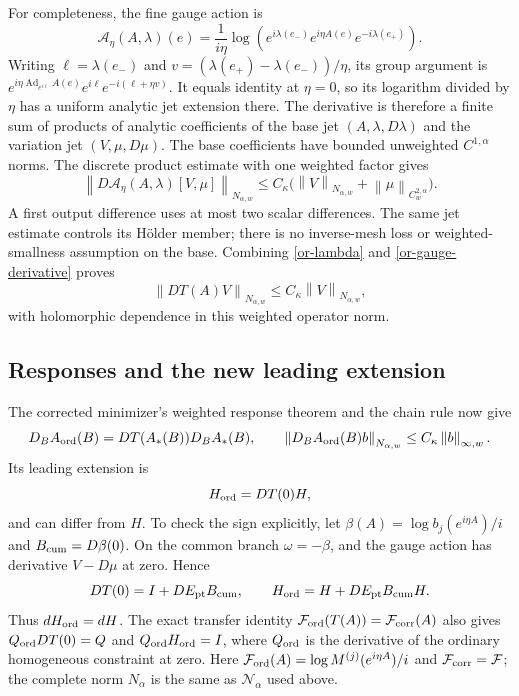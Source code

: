 \documentclass[11pt]{article}
\theoremstyle{remark}
\newcommand{\norm}[1]{\left\|#1\right\|}
\begin{document}
For completeness, the fine gauge action is
\[
 \mathscr A_\eta(A,\lambda)(e)=\frac1{i\eta}\log
 (e^{i\lambda(e_-)}e^{i\eta A(e)}e^{-i\lambda(e_+)}).
\]
Writing $\ell=\lambda(e_-)$ and
$v=(\lambda(e_+)-\lambda(e_-))/\eta$, its group argument is
$e^{i\eta\operatorname{Ad}_{e^{i\ell}}A(e)}
e^{i\ell}e^{-i(\ell+\eta v)}$.
It equals identity at $\eta=0$, so its logarithm divided by
$\eta$ has a uniform analytic jet extension there.
The derivative is therefore a finite sum of products of analytic
coefficients of the base jet $(A,\lambda,D\lambda)$ and the
variation jet $(V,\mu,D\mu)$. The base coefficients have bounded
unweighted $C^{1,\alpha}$ norms. The discrete product estimate
with one weighted factor gives
\begin{equation}\label{or-gauge-derivative}
 \norm{D\mathscr A_\eta(A,\lambda)[V,\mu]}_{N_{\alpha,w}}
 \le C_\kappa\bigl(\norm{V}_{N_{\alpha,w}}
                         +\norm{\mu}_{C^{2,\alpha}_w}\bigr).
\end{equation}
A first output difference uses at most two scalar differences.
The same jet estimate controls its H\"older member; there is no
inverse-mesh loss or weighted-smallness assumption on the base.
Combining \eqref{or-lambda} and \eqref{or-gauge-derivative} proves
\begin{equation}\label{or-DT}
 \norm{DT(A)V}_{N_{\alpha,w}}
                  \le C_\kappa\norm{V}_{N_{\alpha,w}},
\end{equation}
with holomorphic dependence in this weighted operator norm.

\subsection{Responses and the new leading extension}

The corrected minimizer's weighted response theorem and the chain
rule now give
\begin{equation}\label{or-first}
 D_BA_{\rm ord}(B)=DT(A_*(B))D_BA_*(B),\qquad
 \norm{D_BA_{\rm ord}(B)b}_{N_{\alpha,w}}
                 \le C_\kappa\norm{b}_{\infty,w}.
\end{equation}
Its leading extension is
\begin{equation}\label{or-leading}
 H_{\rm ord}=DT(0)H,
\end{equation}
and can differ from $H$. To check the sign explicitly, let
$\beta(A)=\log b_j(e^{i\eta A})/i$ and
$B_{\rm cum}=D\beta(0)$. On the common branch $\omega=-\beta$,
and the gauge action has derivative $V-D\mu$ at zero. Hence
\begin{equation}\label{or-leading-explicit}
 DT(0)=I+DE_{\rm pt}B_{\rm cum},\qquad
 H_{\rm ord}=H+DE_{\rm pt}B_{\rm cum}H.
\end{equation}
Thus $dH_{\rm ord}=dH$.
The exact transfer identity
$\mathcal F_{\rm ord}(T(A))=\mathcal F_{\rm corr}(A)$
also gives $Q_{\rm ord}DT(0)=Q$ and
$Q_{\rm ord}H_{\rm ord}=I$, where $Q_{\rm ord}$ is the
derivative of the ordinary homogeneous constraint at zero.
Here $\mathcal F_{\rm ord}(A)=\log M^{(j)}(e^{i\eta A})/i$
and $\mathcal F_{\rm corr}=\mathcal F$; the complete norm
$N_\alpha$ is the same as $\mathcal N_\alpha$ used above.
\end{document}
